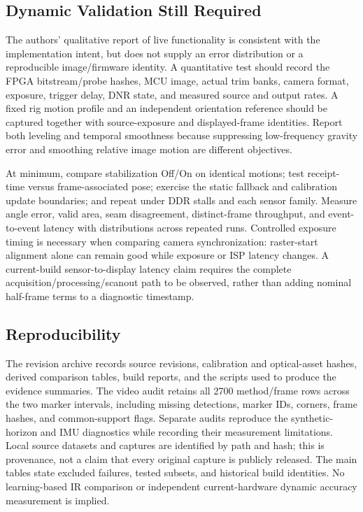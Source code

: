 \subsection{Dynamic Validation Still Required}
The authors' qualitative report of live functionality is consistent with the implementation intent, but does not supply an error distribution or a reproducible image/firmware identity. A quantitative test should record the FPGA bitstream/probe hashes, MCU image, actual trim banks, camera format, exposure, trigger delay, DNR state, and measured source and output rates. A fixed rig motion profile and an independent orientation reference should be captured together with source-exposure and displayed-frame identities. Report both leveling and temporal smoothness because suppressing low-frequency gravity error and smoothing relative image motion are different objectives.

At minimum, compare stabilization Off/On on identical motions; test receipt-time versus frame-associated pose; exercise the static fallback and calibration update boundaries; and repeat under DDR stalls and each sensor family. Measure angle error, valid area, seam disagreement, distinct-frame throughput, and event-to-event latency with distributions across repeated runs. Controlled exposure timing is necessary when comparing camera synchronization: raster-start alignment alone can remain good while exposure or ISP latency changes. A current-build sensor-to-display latency claim requires the complete acquisition/processing/scanout path to be observed, rather than adding nominal half-frame terms to a diagnostic timestamp.

\subsection{Reproducibility}
The revision archive records source revisions, calibration and optical-asset hashes, derived comparison tables, build reports, and the scripts used to produce the evidence summaries. The video audit retains all 2700 method/frame rows across the two marker intervals, including missing detections, marker IDs, corners, frame hashes, and common-support flags. Separate audits reproduce the synthetic-horizon and IMU diagnostics while recording their measurement limitations. Local source datasets and captures are identified by path and hash; this is provenance, not a claim that every original capture is publicly released. The main tables state excluded failures, tested subsets, and historical build identities. No learning-based IR comparison or independent current-hardware dynamic accuracy measurement is implied.
